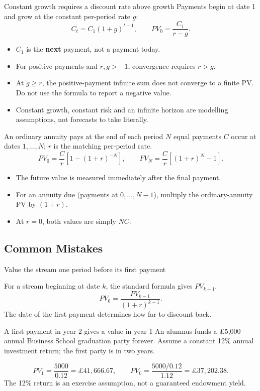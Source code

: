 \documentclass[9pt,aspectratio=169]{beamer}
\begin{document}
\begin{frame}{Constant growth requires a discount rate above growth}
Payments begin at date 1 and grow at the constant per-period rate $g$:
\[
C_t=C_1(1+g)^{t-1},\qquad PV_0=\frac{C_1}{r-g}.
\]
\begin{itemize}
\item $C_1$ is the \textbf{next} payment, not a payment today.
\item For positive payments and $r,g>-1$, convergence requires $r>g$.
\item At $g\geq r$, the positive-payment infinite sum does not converge to a finite PV. Do not use the formula to report a negative value.
\item Constant growth, constant risk and an infinite horizon are modelling assumptions, not forecasts to take literally.
\end{itemize}
\end{frame}

\begin{frame}{An ordinary annuity pays at the end of each period}
$N$ equal payments $C$ occur at dates $1,\ldots,N$; $r$ is the matching per-period rate.
\[
PV_0=\frac{C}{r}\left[1-(1+r)^{-N}\right],\qquad
FV_N=\frac{C}{r}\left[(1+r)^N-1\right].
\]
\begin{itemize}
\item The future value is measured immediately after the final payment.
\item For an annuity due (payments at $0,\ldots,N-1$), multiply the ordinary-annuity PV by $(1+r)$.
\item At $r=0$, both values are simply $NC$.
\end{itemize}
\end{frame}

\subsection{Common Mistakes}

\begin{frame}{Value the stream one period before its first payment}
\begin{center}\end{center}
For a stream beginning at date $k$, the standard formula gives $PV_{k-1}$.
\[
PV_0=\frac{PV_{k-1}}{(1+r)^{k-1}}.
\]
The date of the first payment determines how far to discount back.
\end{frame}

\begin{frame}{A first payment in year 2 gives a value in year 1}
An alumnus funds a £5,000 annual Business School graduation party forever. Assume a constant 12\% annual investment return; the first party is in two years.
\begin{center}\end{center}
\[
PV_1=\frac{5000}{0.12}=\text{£}41,666.67,\qquad
PV_0=\frac{5000/0.12}{1.12}=\boxed{\text{£}37,202.38}.
\]
The 12\% return is an exercise assumption, not a guaranteed endowment yield.
\end{frame}
\end{document}
